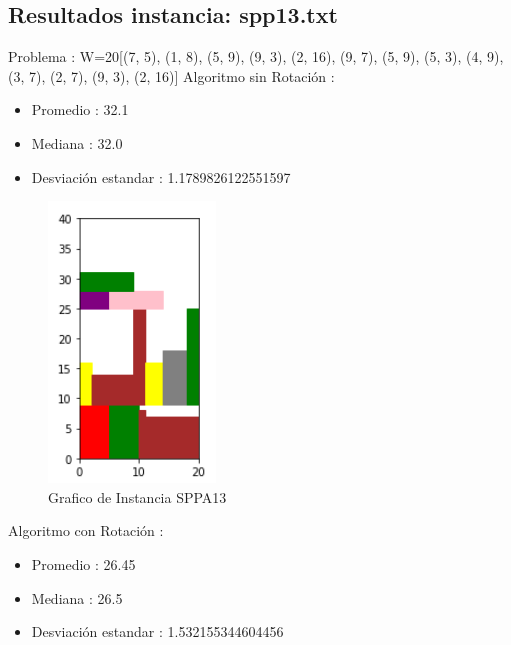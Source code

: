 \documentclass[10pt]{article}
\begin{document}
\subsection{Resultados instancia: spp13.txt}%
\label{subsec:Resultadosinstanciaspp13.txt}%
Problema : W=20{[}(7, 5), (1, 8), (5, 9), (9, 3), (2, 16), (9, 7), (5, 9), (5, 3), (4, 9), (3, 7), (2, 7), (9, 3), (2, 16){]} \newline%
%
 Algoritmo sin Rotación : %
\begin{itemize}%
\item%
Promedio : 32.1%
\item%
Mediana : 32.0%
\item%
Desviación estandar : 1.1789826122551597%
\end{itemize}

\begin{figure}[H]
\centerline{\includegraphics[width=0.5\linewidth]{6_sin_rotar.jpg}}
\caption{Grafico de Instancia SPPA13 }
\label{fig_11}
\end{figure} 

%
Algoritmo con Rotación : %
\begin{itemize}%
\item%
Promedio : 26.45%
\item%
Mediana : 26.5%
\item%
Desviación estandar : 1.532155344604456%
\end{itemize}
\end{document}
